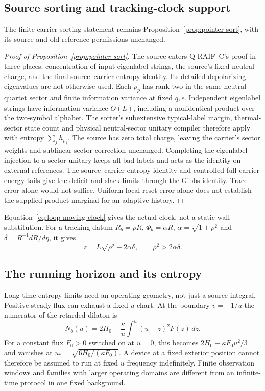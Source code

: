 \documentclass[12pt,a4paper]{article}
\begin{document}
\subsection{Source sorting and tracking-clock support}
\label{app:source-clock-support}

The finite-carrier sorting statement remains
Proposition~\ref{prop:pointer-sort}, with its source and old-reference
permissions unchanged.
\begin{proof}[Proof of Proposition~\ref{prop:pointer-sort}]
The source enters Q-RAIF~C's proof in three places: concentration
of input eigenlabel strings, the source's fixed neutral charge, and the
final source--carrier entropy identity. Its detailed depolarizing
eigenvalues are not otherwise used. Each $\rho_p$ has rank two in the
same neutral quartet sector and finite information variance at fixed
$q,\epsilon$. Independent eigenlabel
strings have information variance $O(L)$, including a nonidentical
product over the two-symbol alphabet. The sorter's subextensive
typical-label margin, thermal-sector state count and physical
neutral-sector unitary compiler therefore apply with entropy
$\sum_jh_{p_j}$. The source has zero total charge, leaving the carrier's
sector weights and sublinear sector correction unchanged. Completing
the eigenlabel injection to a sector unitary keeps all bad labels and
acts as the identity on external references. The source--carrier entropy
identity and controlled full-carrier energy tails give the deficit and
slack limits through the Gibbs identity. Trace error alone would not
suffice. Uniform local reset error alone does not establish the supplied
product marginal for an adaptive history.
\end{proof}

Equation~\eqref{eq:loop-moving-clock} gives the actual clock, not
a static-wall substitution. For a tracking datum $R_b=\rho R$,
$\Phi_b=\alpha R$, $\alpha=\sqrt{1+\rho^2}$ and
$\delta=R^{-1}dR/d\eta$, it gives
\begin{equation}\label{eq:tracking-clock-exact}
 z=L\sqrt{\rho^2-2\alpha\delta},\qquad \rho^2>2\alpha\delta.
\end{equation}

\subsection{The running horizon and its entropy}
\label{sec:running-horizon}

Long-time entropy limits need an operating geometry, not just a source integral.
Positive steady flux can exhaust a fixed $u$ chart. At the boundary $v=-1/u$
the numerator of the retarded dilaton is
\[
 N_b(u)=2H_0-\frac{\kappa}{u}\int^u(u-z)^2F(z)\,dz.
\]
For a constant flux $F_0>0$ switched on at $u=0$, this becomes
$2H_0-\kappa F_0u^2/3$ and vanishes at
$u_*=\sqrt{6H_0/(\kappa F_0)}$. A device at a fixed exterior position cannot
therefore be assumed to run at fixed $u$ frequency indefinitely. Finite
observation windows and families with larger operating domains are different
from an infinite-time protocol in one fixed background.
\end{document}
